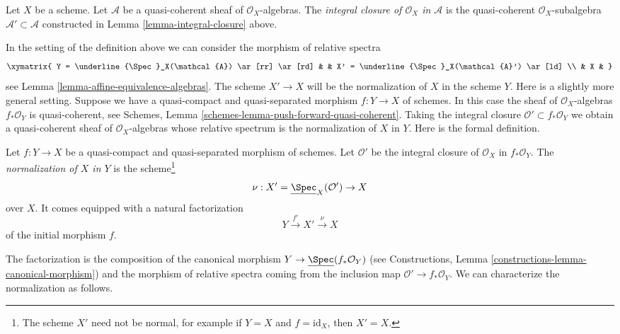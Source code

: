 \begin{definition}
\label{definition-integral-closure}
Let $X$ be a scheme. Let $\mathcal{A}$ be a quasi-coherent sheaf
of $\mathcal{O}_X$-algebras. The {\it integral closure of $\mathcal{O}_X$
in $\mathcal{A}$} is the quasi-coherent $\mathcal{O}_X$-subalgebra
$\mathcal{A}' \subset \mathcal{A}$ constructed in
Lemma \ref{lemma-integral-closure} above.
\end{definition}

\noindent
In the setting of the definition above we can consider the morphism
of relative spectra
$$
\xymatrix{
Y = \underline{\Spec}_X(\mathcal{A}) \ar[rr] \ar[rd] & &
X' = \underline{\Spec}_X(\mathcal{A}') \ar[ld] \\
& X &
}
$$
see Lemma \ref{lemma-affine-equivalence-algebras}.
The scheme $X' \to X$ will be the normalization of $X$ in the scheme $Y$.
Here is a slightly more general setting. Suppose we have a
quasi-compact and quasi-separated morphism $f : Y \to X$
of schemes. In this case the sheaf of
$\mathcal{O}_X$-algebras $f_*\mathcal{O}_Y$ is quasi-coherent, see
Schemes, Lemma \ref{schemes-lemma-push-forward-quasi-coherent}.
Taking the integral closure $\mathcal{O}' \subset f_*\mathcal{O}_Y$
we obtain a quasi-coherent sheaf of $\mathcal{O}_X$-algebras
whose relative spectrum is the normalization of $X$ in $Y$. Here is
the formal definition.

\begin{definition}
\label{definition-normalization-X-in-Y}
Let $f : Y \to X$ be a quasi-compact and quasi-separated morphism of schemes.
Let $\mathcal{O}'$ be the integral closure of $\mathcal{O}_X$ in
$f_*\mathcal{O}_Y$. The {\it normalization of $X$ in $Y$} is the
scheme\footnote{The scheme $X'$ need not be normal, for example if
$Y = X$ and $f = \text{id}_X$, then $X' = X$.}
$$
\nu : X' = \underline{\Spec}_X(\mathcal{O}') \to X
$$
over $X$. It comes equipped with a natural factorization
$$
Y \xrightarrow{f'} X' \xrightarrow{\nu} X
$$
of the initial morphism $f$.
\end{definition}

\noindent
The factorization is the composition of the canonical morphism
$Y \to \underline{\Spec}(f_*\mathcal{O}_Y)$ (see
Constructions, Lemma
\ref{constructions-lemma-canonical-morphism})
and the morphism of relative spectra coming from the inclusion map
$\mathcal{O}' \to f_*\mathcal{O}_Y$. We can characterize the
normalization as follows.

